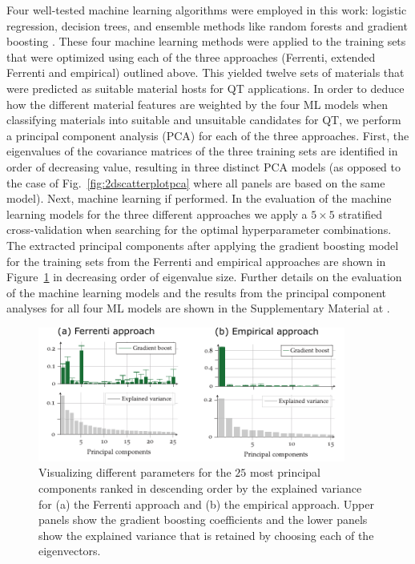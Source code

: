 \documentclass[superscriptaddress,unsortedaddress,
 amsmath,amssymb,
 aps,
]{revtex4-2}
\begin{document}
Four well-tested machine learning algorithms were employed in this work: logistic regression, decision trees, and ensemble methods like random forests and gradient boosting \cite{Mehta2019,Hastie2009}. 
These four machine learning methods were applied to the training sets that were optimized using each of the three approaches (Ferrenti, extended Ferrenti and empirical) outlined above. This yielded twelve sets of materials that were predicted as suitable material hosts for QT applications. 
%
In order to deduce how the different material features are weighted by the four ML models when classifying materials into suitable and unsuitable candidates for QT, we perform a principal component analysis (PCA) for each of the three approaches.   
First, the eigenvalues of the covariance matrices of the three training sets are identified in order of decreasing value,  resulting in three distinct PCA models (as opposed to the case of Fig.~\ref{fig:2dscatterplotpca} where all panels are based on the same model). 
Next, machine learning if performed. 
% 
In the evaluation of the machine learning models for the three different approaches we apply a $5\times 5$ stratified cross-validation when searching for the optimal hyperparameter  combinations. 
%
The extracted principal components after applying the gradient boosting model for the training sets from the Ferrenti and empirical approaches are shown in Figure~\ref{fig:PComponents} in decreasing order of eigenvalue size. 
Further details on the evaluation of the machine learning models and the results from the principal component analyses for all four ML models are shown in the Supplementary Material at \cite{supplementary}. 

\begin{figure}[t]
    \centering
    \includegraphics[width=0.9\textwidth]{figures/PCcomponents.pdf}
    \caption{Visualizing different parameters for the $25$ most principal components ranked in descending order by the explained variance for (a) the Ferrenti approach and (b) the empirical approach. Upper panels show the gradient boosting coefficients and the lower panels show the explained variance that is retained by choosing each of the eigenvectors. %
    }
    \label{fig:PComponents}
\end{figure}
\end{document}
